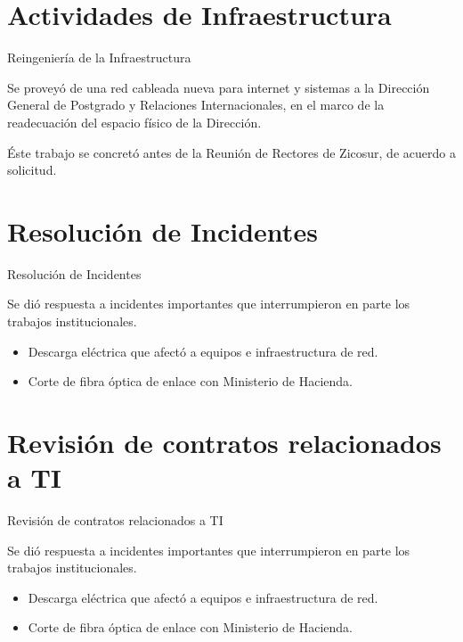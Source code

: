 \documentclass[usenames,dvipsnames]{beamer}
\begin{document}
\section{Actividades de Infraestructura}
\begin{frame}{Reingeniería de la Infraestructura}

Se proveyó de una red cableada nueva para internet y sistemas a la Dirección General de Postgrado y Relaciones Internacionales, en el marco de la readecuación del espacio físico de la Dirección.\vspace{10pt}
             	
Éste trabajo se concretó antes de la Reunión de Rectores de Zicosur, de acuerdo a solicitud.

\end{frame}

\section{Resolución de Incidentes}
\begin{frame}{Resolución de Incidentes}

Se dió respuesta a incidentes importantes que interrumpieron en parte los trabajos institucionales.\vspace{10pt}
             	
    \begin{itemize}
		\item Descarga eléctrica que afectó a equipos e infraestructura de red.
		\item Corte de fibra óptica de enlace con Ministerio de Hacienda.
	\end{itemize}


\end{frame}


\section{Revisión de contratos relacionados a TI}
\begin{frame}{Revisión de contratos relacionados a TI}

Se dió respuesta a incidentes importantes que interrumpieron en parte los trabajos institucionales.\vspace{10pt}
             	
    \begin{itemize}
		\item Descarga eléctrica que afectó a equipos e infraestructura de red.
		\item Corte de fibra óptica de enlace con Ministerio de Hacienda.
	\end{itemize}


\end{frame}
\end{document}
